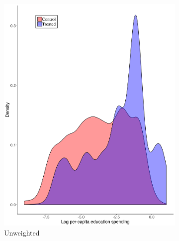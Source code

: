 \documentclass[hidelinks,12pt]{article}
\begin{document}
\begin{appendices}
\begin{figure}[htbp]
	\centering
	\begin{subfigure}[t]{0.48\textwidth}
		\centering
		\includegraphics[width=\textwidth]{plots/educ-dens.png}
		\caption{Unweighted} 
	\end{subfigure}
	~ 
	\begin{subfigure}[t]{0.48\textwidth}
		\centering

\end{subfigure}
\end{figure}
\end{appendices}
\end{document}
